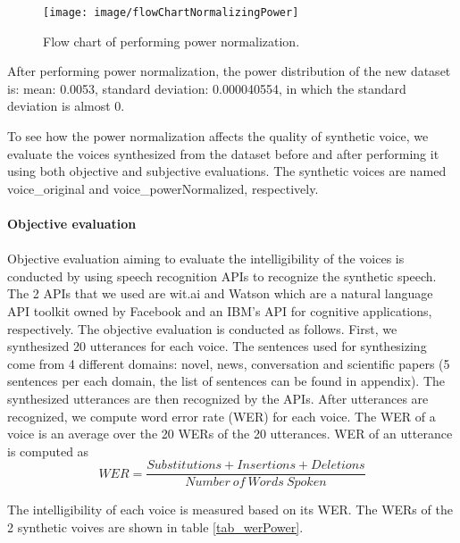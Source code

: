 \documentclass[12pt]{article}
\begin{document}
\begin{figure}[t]
\begin{center}
\texttt{[image: image/flowChartNormalizingPower]}
\end{center}
\vspace{-0.3cm}
\caption[performing power normalization.]{Flow chart of performing power normalization.}
\label{fig_normalizingPower}
\end{figure}

After performing power normalization, the power distribution of the new dataset is: mean: 0.0053, standard deviation: 0.000040554, in which the standard deviation is almost 0.

To see how the power normalization affects the quality of synthetic voice, we evaluate the voices synthesized from the dataset before and after performing it using both objective and subjective evaluations. The synthetic voices are named voice\_original and voice\_powerNormalized, respectively.\\\\
\textbf{Objective evaluation}\\\\
Objective evaluation aiming to evaluate the intelligibility of the voices is conducted by using speech recognition APIs to recognize the synthetic speech. The 2 APIs that we used are wit.ai and Watson which are a natural language API toolkit owned by Facebook and an IBM’s API for cognitive applications, respectively.
The objective evaluation is conducted as follows.
First, we synthesized 20 utterances for each voice. The sentences used for synthesizing come from 4 different domains: novel, news, conversation and scientific papers (5 sentences per each domain, the list of sentences can be found in appendix). The synthesized utterances are then recognized by the APIs. After utterances are recognized, we compute word error rate (WER) for each voice. The WER of a voice is an average over the 20 WERs of the 20 utterances. WER of an utterance is computed as
\begin{equation}\label{exp_wer}
    WER = \frac{Substitutions + Insertions + Deletions}{Number\:of\:Words\:Spoken}
\end{equation}

The intelligibility of each voice is measured based on its WER. The WERs of the 2 synthetic voives are shown in table \ref{tab_werPower}.
\end{document}

